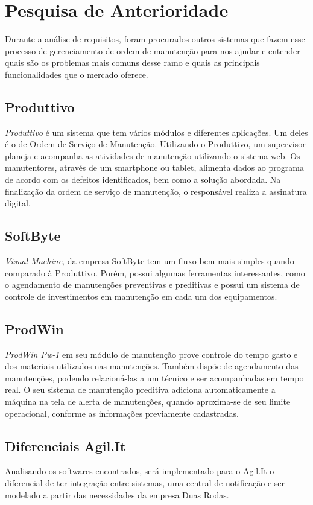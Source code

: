 \chapter{Pesquisa de Anterioridade}
Durante a análise de requisitos, foram procurados outros sistemas que fazem esse processo de gerenciamento de ordem de manutenção para nos ajudar e entender quais são os problemas mais comuns desse ramo e quais as principais funcionalidades que o mercado oferece.

\section{Produttivo}

\textit{Produttivo} é um sistema que tem vários módulos e diferentes aplicações. Um deles é o de Ordem de Serviço de Manutenção.
Utilizando o Produttivo, um supervisor planeja e acompanha as atividades de manutenção utilizando o sistema web. Os manutentores, através de um smartphone ou tablet, alimenta dados ao programa de acordo com os defeitos identificados, bem como a solução abordada. Na finalização da ordem de serviço de manutenção, o responsável realiza a assinatura digital. \cite{produttivo}


\section{SoftByte}
\textit{Visual Machine}, da empresa SoftByte tem um fluxo bem mais simples quando comparado à Produttivo. Porém, possui algumas ferramentas interessantes, como o agendamento de manutenções preventivas e preditivas e possui um sistema de controle de investimentos em manutenção em cada um dos equipamentos. \cite{softbyte}


\section{ProdWin}
\textit{ProdWin Pw-1} em seu módulo de manutenção prove controle do tempo gasto e dos materiais utilizados nas manutenções. Também dispõe de agendamento das manutenções, podendo relacioná-las a um técnico e ser acompanhadas em tempo real. O seu sistema de manutenção preditiva adiciona automaticamente a máquina na tela de alerta de manutenções, quando aproxima-se de seu limite operacional, conforme as informações previamente cadastradas. \cite{prodwin}

\section{Diferenciais Agil.It}
Analisando os softwares encontrados, será implementado para o Agil.It o diferencial de ter integração entre sistemas, uma central de notificação e ser modelado a partir das necessidades da empresa Duas Rodas.